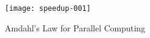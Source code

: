 \begin{figure}[t]
  \label{fig:amdahl}
  \centering
\texttt{[image: speedup-001]}
\caption{Amdahl's Law for Parallel Computing}
\end{figure}
